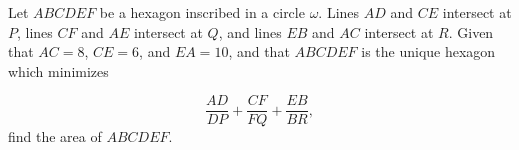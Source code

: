 Let $ABCDEF$ be a hexagon inscribed in a circle $\omega$. Lines $AD$ and $CE$ intersect at $P$, lines $CF$ and $AE$ intersect at $Q$, and lines $EB$ and $AC$ intersect at $R$. Given that $AC=8$, $CE=6$, and $EA=10$, and that $ABCDEF$ is the unique hexagon which minimizes

$$\dfrac{AD}{DP}+\dfrac{CF}{FQ}+\dfrac{EB}{BR},$$find the area of $ABCDEF$.
